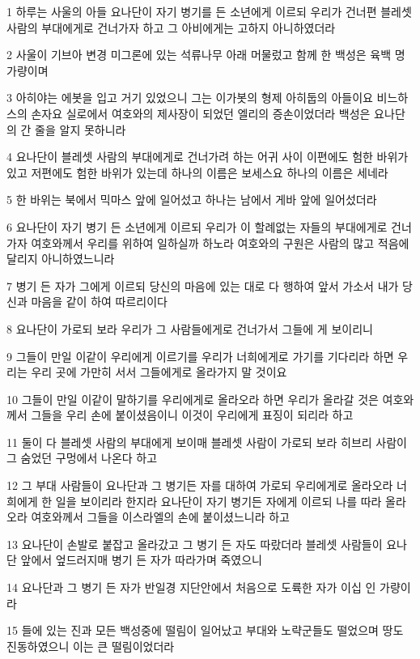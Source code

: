 \par 1 하루는 사울의 아들 요나단이 자기 병기를 든 소년에게 이르되 우리가 건너편 블레셋 사람의 부대에게로 건너가자 하고 그 아비에게는 고하지 아니하였더라
\par 2 사울이 기브아 변경 미그론에 있는 석류나무 아래 머물렀고 함께 한 백성은 육백 명 가량이며
\par 3 아히야는 에봇을 입고 거기 있었으니 그는 이가봇의 형제 아히둡의 아들이요 비느하스의 손자요 실로에서 여호와의 제사장이 되었던 엘리의 증손이었더라 백성은 요나단의 간 줄을 알지 못하니라
\par 4 요나단이 블레셋 사람의 부대에게로 건너가려 하는 어귀 사이 이편에도 험한 바위가 있고 저편에도 험한 바위가 있는데 하나의 이름은 보세스요 하나의 이름은 세네라
\par 5 한 바위는 북에서 믹마스 앞에 일어섰고 하나는 남에서 게바 앞에 일어섰더라
\par 6 요나단이 자기 병기 든 소년에게 이르되 우리가 이 할례없는 자들의 부대에게로 건너가자 여호와께서 우리를 위하여 일하실까 하노라 여호와의 구원은 사람의 많고 적음에 달리지 아니하였느니라
\par 7 병기 든 자가 그에게 이르되 당신의 마음에 있는 대로 다 행하여 앞서 가소서 내가 당신과 마음을 같이 하여 따르리이다
\par 8 요나단이 가로되 보라 우리가 그 사람들에게로 건너가서 그들에 게 보이리니
\par 9 그들이 만일 이같이 우리에게 이르기를 우리가 너희에게로 가기를 기다리라 하면 우리는 우리 곳에 가만히 서서 그들에게로 올라가지 말 것이요
\par 10 그들이 만일 이같이 말하기를 우리에게로 올라오라 하면 우리가 올라갈 것은 여호와께서 그들을 우리 손에 붙이셨음이니 이것이 우리에게 표징이 되리라 하고
\par 11 둘이 다 블레셋 사람의 부대에게 보이매 블레셋 사람이 가로되 보라 히브리 사람이 그 숨었던 구멍에서 나온다 하고
\par 12 그 부대 사람들이 요나단과 그 병기든 자를 대하여 가로되 우리에게로 올라오라 너희에게 한 일을 보이리라 한지라 요나단이 자기 병기든 자에게 이르되 나를 따라 올라오라 여호와께서 그들을 이스라엘의 손에 붙이셨느니라 하고
\par 13 요나단이 손발로 붙잡고 올라갔고 그 병기 든 자도 따랐더라 블레셋 사람들이 요나단 앞에서 엎드러지매 병기 든 자가 따라가며 죽였으니
\par 14 요나단과 그 병기 든 자가 반일경 지단안에서 처음으로 도륙한 자가 이십 인 가량이라
\par 15 들에 있는 진과 모든 백성중에 떨림이 일어났고 부대와 노략군들도 떨었으며 땅도 진동하였으니 이는 큰 떨림이었더라

